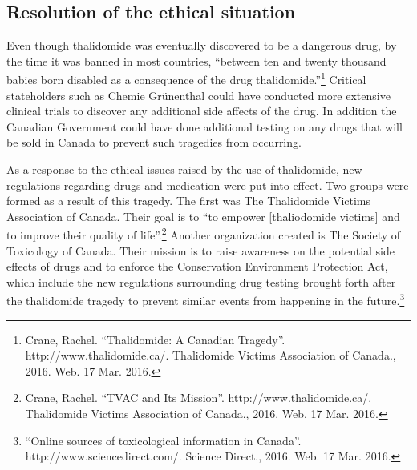 \documentclass[8pt]{article}
\newcommand{\q}[1]{``#1''}
\begin{document}
\subsection{Resolution of the ethical situation}

Even though thalidomide was eventually discovered to be a dangerous drug, by the time it was banned in most countries, \q{between ten and twenty thousand babies born disabled as a consequence of the drug thalidomide.}\footnote{Crane, Rachel. \q{Thalidomide: A Canadian Tragedy}. http://www.thalidomide.ca/. Thalidomide Victims Association of Canada., 2016. Web. 17 Mar. 2016.} Critical stateholders such as Chemie Gr\"{u}nenthal could have conducted more extensive clinical trials to discover any additional side affects of the drug. In addition the Canadian Government could have done additional testing on any drugs that will be sold in Canada to prevent such tragedies from occurring.
\par
As a response to the ethical issues raised by the use of thalidomide, new regulations regarding drugs and medication were put into effect. Two groups were formed as a result of this tragedy. The first was The Thalidomide Victims Association of Canada. Their goal is to \q{to empower [thaliodomide victims] and to improve their quality of life}.\footnote{Crane, Rachel. \q{TVAC and Its Mission}. http://www.thalidomide.ca/. Thalidomide Victims Association of Canada., 2016. Web. 17 Mar. 2016.} Another organization created is The Society of Toxicology of Canada. Their mission is to raise awareness on the potential side effects of drugs and to enforce the Conservation Environment Protection Act, which include the new regulations surrounding drug testing brought forth after the thalidomide tragedy to prevent similar events from happening in the future.\footnote{\q{Online sources of toxicological information in Canada}. http://www.sciencedirect.com/. Science Direct., 2016. Web. 17 Mar. 2016.}
\end{document}
